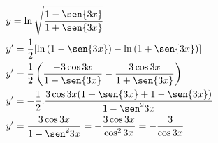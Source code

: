 \begin{ex}
\begin{align}
&y=\ln{\sqrt{\frac{1-\sen{3x}}{1+\sen{3x}}}}\nonumber\\
&y'=\frac{1}{2}[\ln{(1-\sen{3x})}-\ln{(1+\sen{3x})}]\nonumber\\
&y'=\frac{1}{2}\left(\frac{-3\cos{3x}}{1-\sen{3x}}-\frac{3\cos{3x}}{1+\sen{3x}}\right)\nonumber\\
&y'=-\frac{1}{2}.\frac{3\cos{3x}(1+\sen{3x}+1-\sen{3x})}{1-\sen^2{3x}}\nonumber\\
&y'=\frac{3\cos{3x}}{1-\sen^2{3x}}=-\frac{3\cos{3x}}{\cos^2{3x}}=-\frac{3}{\cos{3x}}\nonumber
\end{align}
\end{ex}
